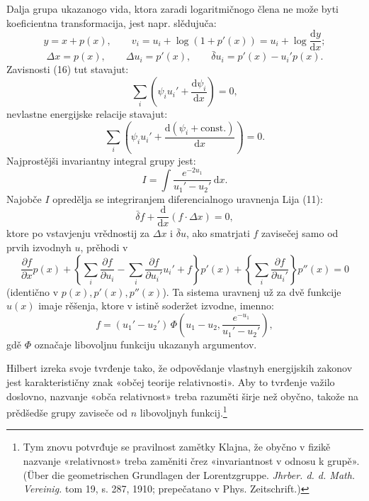 \documentclass[11pt]{article}
\providecommand{\D}{\Delta}
\providecommand{\p}{\partial}
\providecommand{\dd}{\mathrm d}
\providecommand{\bd}{\bar{\delta}}
\providecommand{\lg}{\log}
\begin{document}
Dalja grupa ukazanogo vida, ktora zaradi logaritmičnogo člena ne može byti koeficientna transformacija, jest napr. slědujuča:
\[
y=x+p(x),\qquad
v_i=u_i+\lg(1+p'(x))=u_i+\lg\frac{\dd y}{\dd x};
\]
\[
\D x=p(x),\qquad
\D u_i=p'(x),\qquad
\bd u_i=p'(x)-u_i'p(x).
\]
Zavisnosti (16) tut stavajut:
\[
\sum_i\left(\psi_i u_i'+\frac{\dd\psi_i}{\dd x}\right)=0,
\]
nevlastne energijske relacije stavajut:
\[
\sum_i\left(\psi_i u_i'+
\frac{\dd(\psi_i+\mathrm{const.})}{\dd x}\right)=0.
\]
Najprostějši invariantny integral grupy jest:
\[
I=\int \frac{e^{-2u_1}}{u_1'-u_2'}\,\dd x.
\]
Najobče \(I\) opredělja se integriranjem diferencialnogo uravnenja Lija (11):
\[
\bd f+\frac{\dd}{\dd x}(f\cdot \D x)=0,
\]
ktore po vstavjenju vrědnostij za \(\D x\) i \(\bd u\), ako smatrjati \(f\) zavisečej samo od prvih izvodnyh \(u\), prěhodi v
\[
\frac{\p f}{\p x}p(x)
+\left\{\sum_i\frac{\p f}{\p u_i}
-\sum_i\frac{\p f}{\p u_i'}u_i'+f\right\}p'(x)
+\left\{\sum_i\frac{\p f}{\p u_i'}\right\}p''(x)=0
\]
(identično v \(p(x),p'(x),p''(x)\)). Ta sistema uravnenj už za dvě funkcije \(u(x)\) imaje rěšenja, ktore v istině soderžet izvodne, imenno:
\[
f=(u_1'-u_2')\,
\Phi\!\left(u_1-u_2,\frac{e^{-u_1}}{u_1'-u_2'}\right),
\]
gdě \(\Phi\) označaje libovoljnu funkciju ukazanyh argumentov.

Hilbert izreka svoje tvrđenje tako, že odpovědanje vlastnyh energijskih zakonov jest karakterističny znak «občej teorije relativnosti». Aby to tvrđenje važilo doslovno, nazvanje «obča relativnost» treba razuměti širje než obyčno, takože na prědšedše grupy zaviseče od \(n\) libovoljnyh funkcij.\footnote{Tym znovu potvrđuje se pravilnost zamětky Klajna, že obyčno v fizikě nazvanje «relativnost» treba zaměniti črez «invariantnost v odnosu k grupě». (Über die geometrischen Grundlagen der Lorentzgruppe. \emph{Jhrber. d. d. Math. Vereinig.} tom 19, s. 287, 1910; prepečatano v Phys. Zeitschrift.)}
\end{document}
